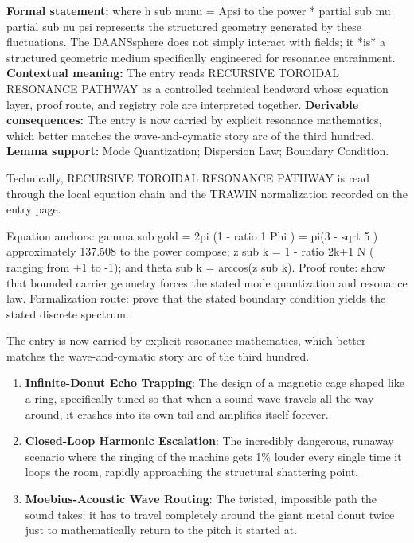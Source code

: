 \begingroup\footnotesize\setlength{\emergencystretch}{3em}\sloppy
\textbf{Formal statement:} where h sub munu = Apsi to the power * partial sub mu partial sub nu psi represents the structured geometry generated by these fluctuations. The DAANSsphere does not simply interact with fields; it *is* a structured geometric medium specifically engineered for resonance entrainment. \textbf{Contextual meaning:} The entry reads RECURSIVE TOROIDAL RESONANCE PATHWAY as a controlled technical headword whose equation layer, proof route, and registry role are interpreted together. \textbf{Derivable consequences:} The entry is now carried by explicit resonance mathematics, which better matches the wave-and-cymatic story arc of the third hundred. \textbf{Lemma support:} Mode Quantization; Dispersion Law; Boundary Condition.\par
\endgroup

Technically, RECURSIVE TOROIDAL RESONANCE PATHWAY is read through the local equation chain and the TRAWIN normalization recorded on the entry page.

Equation anchors: gamma sub gold = 2pi (1 - ratio 1 Phi ) = pi(3 - sqrt 5 ) approximately 137.508 to the power compose; z sub k = 1 - ratio 2k+1 N ( ranging from +1 to -1); and theta sub k = arccos(z sub k). Proof route: show that bounded carrier geometry forces the stated mode quantization and resonance law. Formalization route: prove that the stated boundary condition yields the stated discrete spectrum.

The entry is now carried by explicit resonance mathematics, which better matches the wave-and-cymatic story arc of the third hundred.
\endgroup

\begin{enumerate}[leftmargin=1.6em,itemsep=6pt,topsep=4pt]
\item \textbf{Infinite-Donut Echo Trapping}: The design of a magnetic cage shaped like a ring, specifically tuned so that when a sound wave travels all the way around, it crashes into its own tail and amplifies itself forever.
\item \textbf{Closed-Loop Harmonic Escalation}: The incredibly dangerous, runaway scenario where the ringing of the machine gets 1\% louder every single time it loops the room, rapidly approaching the structural shattering point.
\item \textbf{Moebius-Acoustic Wave Routing}: The twisted, impossible path the sound takes; it has to travel completely around the giant metal donut twice just to mathematically return to the pitch it started at.
\end{enumerate}

